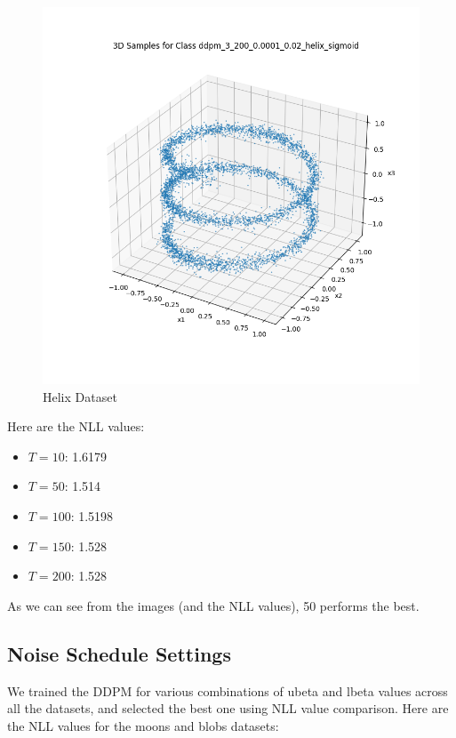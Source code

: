 \documentclass[a4paper,12pt]{article}
\begin{document}
\begin{figure}[H]
\begin{minipage}{0.3\textwidth}
  \end{minipage}
  \begin{minipage}{0.3\textwidth}
      \centering
      \includegraphics[width=\linewidth]{"images/Samples for ddpm_3_200_0.0001_0.02_helix_sigmoid.png"}
  \end{minipage}

  \caption{Helix Dataset}
\end{figure}


Here are the NLL values:
\begin{itemize}
  \item $T = 10$: 1.6179
  \item $T = 50$: 1.514
  \item $T = 100$: 1.5198
  \item $T = 150$: 1.528
  \item $T = 200$: 1.528
\end{itemize}

As we can see from the images (and the NLL values), 50 performs the best.

\subsection*{Noise Schedule Settings}
We trained the DDPM for various combinations of ubeta and lbeta values across all the datasets, and selected the best one using NLL value comparison. Here are the NLL values for the moons and blobs datasets:
\end{document}
